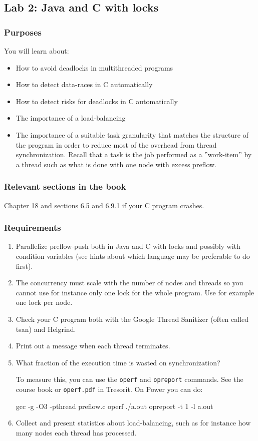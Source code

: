 \documentclass{forsete}
\begin{document}
\newpage
\subsection*{Lab 2: Java and C with locks}
\subsubsection*{Purposes}
You will learn about:
\begin{itemize}
\item How to avoid deadlocks in multithreaded programs
\item How to detect data-races in C automatically
\item How to detect risks for deadlocks in C automatically
\item The importance of a load-balancing
\item The importance of a suitable task granularity
that
matches the structure of the program in order to reduce most of the overhead from
thread synchronization.
Recall that a task is  the job performed as a ''work-item''
by a thread such as what is done with one node with excess preflow.
\end{itemize}

\subsubsection*{Relevant sections in the book}
Chapter 18 and sections 6.5 and 6.9.1 if your C program crashes.
\subsubsection*{Requirements}
\begin{enumerate}
\item Parallelize preflow-push both in Java and C with locks and possibly with
condition variables (see hints about which language may be preferable to do first).

\item The concurrency must scale with the number of nodes and threads so you cannot use for instance
only one lock for the whole program. Use for example one lock per node.

\item Check your C program both with
the Google Thread Sanitizer (often called tsan) and Helgrind. 

\item Print out a message when each thread terminates.

\item What fraction of the execution time is wasted on synchronization?

To measure this, you can use the \verb.operf. and \verb.opreport. commands. See the course book or
\verb!operf.pdf! in Tresorit. On Power you can do:
\begin{ccode}
gcc -g -O3 -pthread preflow.c
operf ./a.out
opreport -t 1 -l a.out
\end{ccode}

\item Collect and present statistics about load-balancing, such as
for instance how many nodes each thread has processed.
\end{enumerate}
\end{document}
